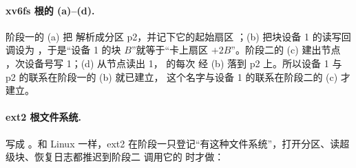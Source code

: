 \paragraph{xv6fs 根的 (a)--(d).} 阶段一的 (a) 把  解析成分区 p2，并记下它的起始扇区 ；(b)  把块设备 1 的读写回调设为 ，于是“设备 1 的块 $B$”就等于“卡上扇区 $+2B$”。阶段二的 (c) 建出节点 ，次设备号写 1；(d)  从节点读出 1， 的每次  经 (b) 落到 p2 上。所以设备 1 与 p2 的联系在阶段一的 (b) 就已建立， 这个名字与设备 1 的联系在阶段二的 (c) 才建立。

\paragraph{ext2 根文件系统.}  写成 。和 Linux 一样，ext2 在阶段一只登记“有这种文件系统”，打开分区、读超级块、恢复日志都推迟到阶段二  调用它的  时才做：

